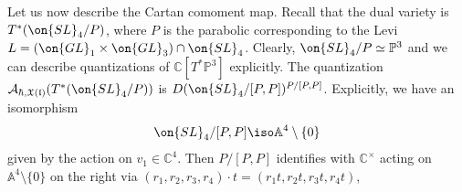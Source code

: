 \documentclass[12pt]{amsart}
\begin{document}

    

    Let us now describe the Cartan comoment map. Recall that the dual variety is $T^*(\on{SL}_4/P)$, where $P$ is the parabolic corresponding to the Levi $L=(\on{GL}_1 \times \on{GL}_3) \cap \on{SL}_4$. Clearly, $\on{SL}_4/P \simeq \mathbb{P}^3$ and we can describe quantizations of $\mathbb{C}[T^*\mathbb{P}^3]$ explicitly. The quantization $\mathcal{A}_{\hbar,\mathfrak{X}(\mathfrak{l})}(T^*(\on{SL}_4/P))$ is $D(\on{SL}_4/[P,P])^{P/[P,P]}$. Explicitly, we have an isomorphism 
    \begin{equation*}
    \on{SL}_4/[P,P] \iso \mathbb{A}^4 \setminus \{0\}
    \end{equation*}
    given by the action on $v_1 \in \mathbb{C}^4$. Then $P/[P,P]$ identifies with $\mathbb{C}^\times$ acting on $\mathbb{A}^4 \setminus \{0\}$ on the right via $(r_1,r_2,r_3,r_4) \cdot t = (r_1t,r_2t,r_3t,r_4t)$, 
\end{document}
